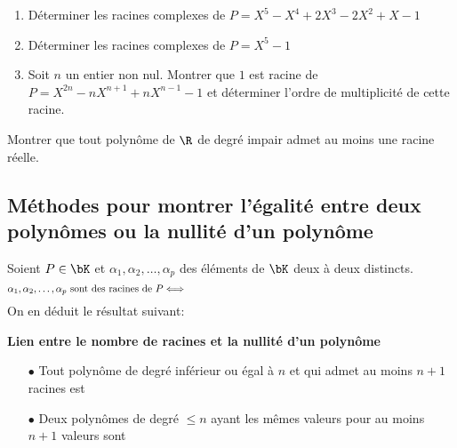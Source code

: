 \documentclass[a4paper, 11pt,reqno]{article}
\begin{document}
{\footnotesize
\begin{exercice}
	\begin{enumerate}
		\item D\'eterminer les racines complexes de $P=X^5-X^4+2X^3-2X^2+X-1$
		\item D\'eterminer les racines complexes de $P=X^5-1$
		\item Soit $n$ un entier non nul. Montrer que $1$ est racine de $P=X^{2n}-nX^{n+1}+nX^{n-1}-1$ et d\'eterminer l'ordre de multiplicit\'e de cette racine.
	\end{enumerate}
\end{exercice}}

{\footnotesize
\begin{exercice}
	Montrer que tout polyn\^ome de $\R$ de degr\'e impair admet au moins une racine r\'eelle.
\end{exercice}}


\subsection{M\'ethodes pour montrer l'\'egalit\'e entre deux polyn\^omes ou la nullit\'e d'un polyn\^ome}

\noindent
Soient $P\in\bK$ et $\alpha_1,\alpha_2,\dots,\alpha_p$ des \'el\'ements de $\bK$ deux \`a deux distincts.
$$\alpha_1,\alpha_2,\dots,\alpha_p\ \hbox{sont des racines de}\ P\Longleftrightarrow \hspace{9.5cm}  $$
On en d\'eduit le r\'esultat suivant:\\

{\noindent

\begin{theorem} \textbf{Lien entre le nombre de racines et la nullit\'e d'un polyn\^ome}\vsec
	\begin{itemize}
		\item[$\bullet$] Tout polyn\^ome de degr\'e inf\'erieur ou \'egal \`a $n$ et qui admet au moins $n+1$ racines est \dotfill \vsec
		\item[$\bullet$] Deux polyn\^omes de degr\'e  $\leq n$ ayant les m\^emes valeurs pour au moins $n+1$ valeurs sont \dotfill \vsec
	\end{itemize}
\end{theorem}
}\vsec\vsec
\end{document}
